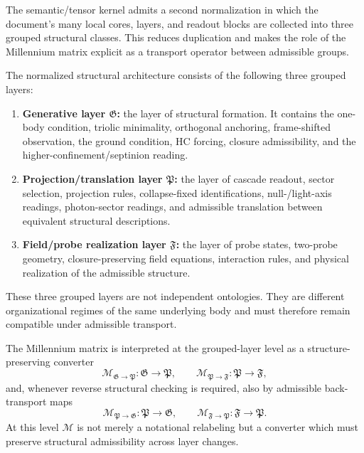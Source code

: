 The semantic/tensor kernel admits a second normalization in which the document's
many local cores, layers, and readout blocks are collected into three grouped
structural classes. This reduces duplication and makes the role of the
Millennium matrix explicit as a transport operator between admissible groups.

\begin{definition}
\label{def:grouped-structural-architecture}
The normalized structural architecture consists of the following three grouped
layers:
\begin{enumerate}[leftmargin=2em,label=(G\arabic*)]
\item \textbf{Generative layer $\mathfrak G$:} the layer of structural formation. It
contains the one-body condition, triolic minimality, orthogonal anchoring,
frame-shifted observation, the ground condition, HC forcing, closure
admissibility, and the higher-confinement/septinion reading.
\item \textbf{Projection/translation layer $\mathfrak P$:} the layer of cascade readout,
sector selection, projection rules, collapse-fixed identifications, null-/light-axis
readings, photon-sector readings, and admissible translation between equivalent
structural descriptions.
\item \textbf{Field/probe realization layer $\mathfrak F$:} the layer of probe states,
two-probe geometry, closure-preserving field equations, interaction rules, and
physical realization of the admissible structure.
\end{enumerate}
These three grouped layers are not independent ontologies. They are different
organizational regimes of the same underlying body and must therefore remain
compatible under admissible transport.
\end{definition}

\begin{definition}
\label{def:millennium-transport-grouped-layers}
The Millennium matrix is interpreted at the grouped-layer level as a
structure-preserving converter
\[
\mathcal M_{\mathfrak G\to\mathfrak P}:\mathfrak G\to\mathfrak P,
\qquad
\mathcal M_{\mathfrak P\to\mathfrak F}:\mathfrak P\to\mathfrak F,
\]
and, whenever reverse structural checking is required, also by admissible
back-transport maps
\[
\mathcal M_{\mathfrak P\to\mathfrak G}:\mathfrak P\to\mathfrak G,
\qquad
\mathcal M_{\mathfrak F\to\mathfrak P}:\mathfrak F\to\mathfrak P.
\]
At this level $\mathcal M$ is not merely a notational relabeling but a
converter which must preserve structural admissibility across layer changes.
\end{definition}

